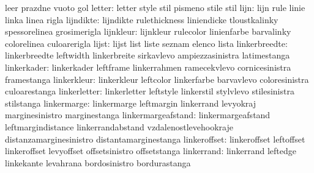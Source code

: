                            leer                      prazdne
                           vuoto                     gol
                   letter: letter                    style
                           stil                      pismeno
                           stile                     stil
                     lijn: lijn                      rule
                           linie                     linka
                           linea                     rigla
                lijndikte: lijndikte                 rulethickness
                           liniendicke               tloustkalinky
                           spessorelinea             grosimerigla
                lijnkleur: lijnkleur                 rulecolor
                           linienfarbe               barvalinky
                           colorelinea               culoarerigla
                    lijst: lijst                     list
                           liste                     seznam
                           elenco                    lista
            linkerbreedte: linkerbreedte             leftwidth
                           linkerbreite              sirkavlevo
                           ampiezzasinistra          latimestanga
              linkerkader: linkerkader               leftframe
                           linkerrahmen              ramecekvlevo
                           cornicesinistra           framestanga
              linkerkleur: linkerkleur               leftcolor
                           linkerfarbe               barvavlevo
                           coloresinistra            culoarestanga
             linkerletter: linkerletter              leftstyle
                           linkerstil                stylvlevo
                           stilesinistra             stilstanga
              linkermarge: linkermarge               leftmargin
                           linkerrand                levyokraj
                           marginesinistro           marginestanga
       linkermargeafstand: linkermargeafstand        leftmargindistance
                           linkerrandabstand         vzdalenostlevehookraje
                           distanzamarginesinistro   distantamarginestanga
             linkeroffset: linkeroffset              leftoffset
                           linkeroffset              levyoffset
                           offsetsinistro            offsetstanga
               linkerrand: linkerrand                leftedge
                           linkekante                levahrana
                           bordosinistro             bordurastanga
